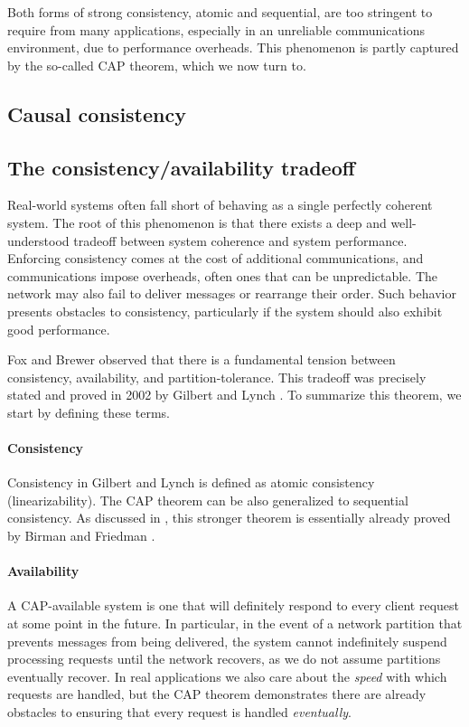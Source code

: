 Both forms of strong consistency, atomic and sequential, are too
stringent to require from many applications, especially in an
unreliable communications environment, due to performance overheads.
This phenomenon is partly captured by the so-called CAP theorem, which
we now turn to.

\subsection{Causal consistency}

\subsection{The consistency/availability tradeoff}

Real-world systems often fall short of behaving as a single perfectly
coherent system. The root of this phenomenon is that there exists a
deep and well-understood tradeoff between system coherence and system
performance. Enforcing consistency comes at the cost of additional
communications, and communications impose overheads, often ones that
can be unpredictable. The network may also fail to deliver messages or
rearrange their order. Such behavior presents obstacles to
consistency, particularly if the system should also exhibit good
performance.

Fox and Brewer \cite{1999foxbrewer} observed that there is a
fundamental tension between consistency, availability, and
partition-tolerance. This tradeoff was precisely stated and proved in
2002 by Gilbert and Lynch \cite{2002gilbertlynchCAP}. To summarize
this theorem, we start by defining these terms.

\paragraph{Consistency}

Consistency in Gilbert and Lynch is defined as atomic consistency
(linearizability). The CAP theorem can be also generalized to
sequential consistency. As discussed in \cite{2019wideningcap}, this
stronger theorem is essentially already proved by Birman and Friedman
\cite{10.5555/866855}.

\paragraph{Availability}

A CAP-available system is one that will definitely respond to every
client request at some point in the future. In particular, in the
event of a network partition that prevents messages from being
delivered, the system cannot indefinitely suspend processing requests
until the network recovers, as we do not assume partitions eventually
recover. In real applications we also care about the \emph{speed} with
which requests are handled, but the CAP theorem demonstrates there are
already obstacles to ensuring that every request is handled
\emph{eventually}.

